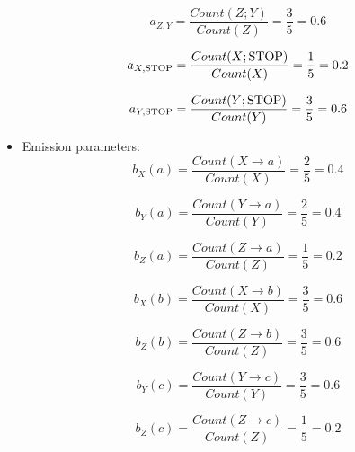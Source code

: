 \documentclass[9pt,twocolumn]{article}
\newcommand{\STOP}{\text{\lstinline{STOP}}}
\begin{document}
\begin{itemize}
                    \begin{equation}
                        a_{Z,Y} = \dfrac{Count(Z;Y)}{Count(Z)} = \dfrac{3}{5} = 0.6
                    \end{equation}

                    \begin{equation}
                        a_{X, \STOP} = \dfrac{Count(X;\STOP)}{Count(X)} = \dfrac{1}{5} = 0.2
                    \end{equation}

                    \begin{equation}
                        a_{Y, \STOP} = \dfrac{Count(Y;\STOP)}{Count(Y)} = \dfrac{3}{5} = 0.6
                    \end{equation}
                \item
                    Emission parameters:
                    \begin{equation}
                        b_X(a) = \dfrac{Count(X \rightarrow a)}{Count(X)} = \dfrac{2}{5} = 0.4
                    \end{equation}

                    \begin{equation}
                        b_Y(a) = \dfrac{Count(Y \rightarrow a)}{Count(Y)} = \dfrac{2}{5} = 0.4
                    \end{equation}

                    \begin{equation}
                        b_Z(a) = \dfrac{Count(Z \rightarrow a)}{Count(Z)} = \dfrac{1}{5} = 0.2
                    \end{equation}

                    \begin{equation}
                        b_X(b) = \dfrac{Count(X \rightarrow b)}{Count(X)} = \dfrac{3}{5} = 0.6
                    \end{equation}

                    \begin{equation}
                        b_Z(b) = \dfrac{Count(Z \rightarrow b)}{Count(Z)} = \dfrac{3}{5} = 0.6
                    \end{equation}

                    \begin{equation}
                        b_Y(c) = \dfrac{Count(Y \rightarrow c)}{Count(Y)} = \dfrac{3}{5} = 0.6
                    \end{equation}

                    \begin{equation}
                        b_Z(c) = \dfrac{Count(Z \rightarrow c)}{Count(Z)} = \dfrac{1}{5} = 0.2
                    \end{equation}
                   
            \end{itemize}
\end{document}
